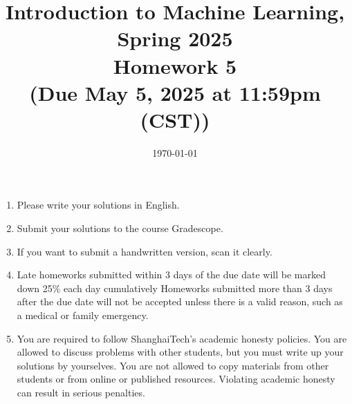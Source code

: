 \documentclass[10pt]{article}
\begin{document}
\date{\today}
\title{Introduction to Machine Learning, Spring 2025 \\
	Homework 5 \\
	\small (Due May 5, 2025 at 11:59pm (CST))}
\maketitle

\begin{enumerate}
	\item Please write your solutions in English.
	\item Submit your solutions to the course Gradescope.
	\item If you want to submit a handwritten version, scan it clearly.
	\item Late homeworks submitted within 3 days of the due date will be marked down 25\% each day cumulatively Homeworks submitted more than 3 days after the due date will not be accepted unless there is a valid reason, such as a medical or family emergency.
	\item You are required to follow ShanghaiTech's academic honesty policies.  You are allowed to discuss problems with other students, but you must write up your solutions by yourselves.  You are not allowed to copy materials from other students or from online or published resources.  Violating academic honesty can result in serious penalties.
	\end{enumerate}
\newpage


\begin{enumerate}



\end{enumerate}
\end{document}
